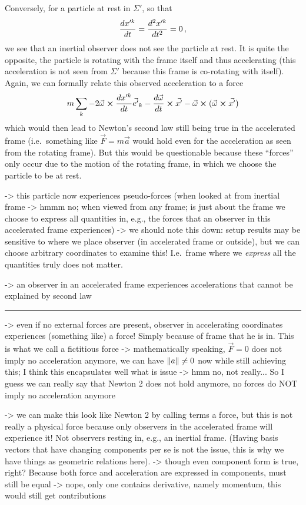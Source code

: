 \documentclass[../class_mech_main.tex]{subfiles}
\begin{document}
Conversely, for a particle at rest in $\Sigma'$, so that
\begin{equation}
	\dv{x'^k}{t} = \dv[2]{x'^k}{t} = 0 \, ,
\end{equation}
we see that an inertial observer does not see the particle at rest. It is quite the opposite, the particle is rotating with the frame itself and thus accelerating (this acceleration is not seen from $\Sigma'$ because this frame is co-rotating with itself). Again, we can formally relate this observed acceleration to a force
\begin{equation}
	m \sum_k - 2 \vec{\omega} \cross \dv{x'^k}{t} \vec{e'}_k - \dv{\vec{\omega}}{t} \cross \vec{x'} - \vec{\omega} \cross (\vec{\omega} \cross \vec{x'})
\end{equation}
which would then lead to Newton's second law still being true in the accelerated frame (i.e.~something like $\vec{F} = m \vec{a}$ would hold even for the acceleration as seen from the rotating frame). But this would be questionable because these \enquote{forces} only occur due to the motion of the rotating frame, in which we choose the particle to be at rest.

-> this particle now experiences pseudo-forces (when looked at from inertial frame -> hmmm no; when viewed from any frame; is just about the frame we choose to express all quantities in, e.g., the forces that an observer in this accelerated frame experiences) -> we should note this down: setup results may be sensitive to where we place observer (in accelerated frame or outside), but we can choose arbitrary coordinates to examine this! I.e.~frame where we \emph{express} all the quantities truly does not matter. 


-> an observer in an accelerated frame experiences accelerations that cannot be explained by second law

\hrule


-> even if no external forces are present, observer in accelerating coordinates experiences (something like) a force! Simply because of frame that he is in. This is what we call a fictitious force -> mathematically speaking, $\vec{F} = 0$ does not imply no acceleration anymore, we can have $\norm{a} \neq 0$ now while still achieving this; I think this encapsulates well what is issue -> hmm no, not really... So I guess we can really say that Newton 2 does not hold anymore, no forces do NOT imply no acceleration anymore

-> we can make this look like Newton 2 by calling terms a force, but this is not really a physical force because only observers in the accelerated frame will experience it! Not observers resting in, e.g., an inertial frame. (Having basis vectors that have changing components per se is not the issue, this is why we have things as geometric relations here). -> though even component form is true, right? Because both force and acceleration are expressed in components, must still be equal -> nope, only one contains derivative, namely momentum, this would still get contributions
\end{document}
